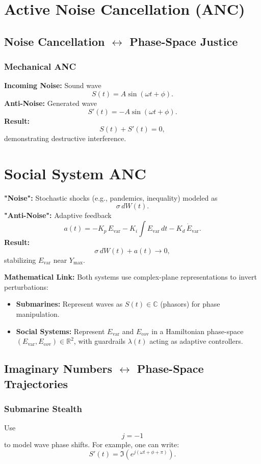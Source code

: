\documentclass{article}
\theoremstyle{definition}
\begin{document}
\section{Active Noise Cancellation (ANC)}

\subsection{Noise Cancellation $\leftrightarrow$ Phase-Space Justice}

\subsubsection{Mechanical ANC}
\textbf{Incoming Noise:} Sound wave 
\[
S(t) = A \sin(\omega t + \phi).
\]
\textbf{Anti-Noise:} Generated wave 
\[
S'(t) = -A \sin(\omega t + \phi).
\]
\textbf{Result:}
\[
S(t) + S'(t) = 0,
\]
demonstrating destructive interference.

\section{Social System ANC}
\textbf{"Noise":} Stochastic shocks (e.g., pandemics, inequality) modeled as 
\[
\sigma\, dW(t).
\]
\textbf{"Anti-Noise":} Adaptive feedback
\[
a(t) = -K_p\, E_{\text{var}} - K_i \int E_{\text{var}}\, dt - K_d\, \dot{E}_{\text{var}}.
\]
\textbf{Result:}
\[
\sigma\, dW(t) + a(t) \rightarrow 0,
\]
stabilizing \( E_{\text{var}} \) near \( Y_{\text{max}} \).

\textbf{Mathematical Link:} Both systems use complex-plane representations to invert perturbations:
\begin{itemize}
    \item \textbf{Submarines:} Represent waves as \( S(t) \in \mathbb{C} \) (phasors) for phase manipulation.
    \item \textbf{Social Systems:} Represent \( E_{\text{var}} \) and \( E_{\text{cov}} \) in a Hamiltonian phase-space \( (E_{\text{var}}, E_{\text{cov}}) \in \mathbb{R}^2 \), with guardrails \( \lambda(t) \) acting as adaptive controllers.
\end{itemize}

\subsection{Imaginary Numbers $\leftrightarrow$ Phase-Space Trajectories}

\subsubsection{Submarine Stealth}
Use 
\[
j = -1
\]
to model wave phase shifts. For example, one can write:
\[
S'(t) = \Im\left(e^{j(\omega t + \phi + \pi)}\right).
\]
\end{document}
